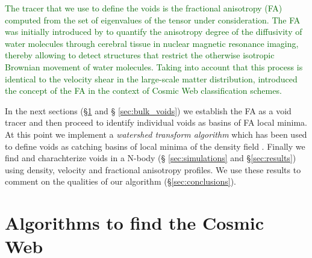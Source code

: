 \documentclass[a4,useAMS,usenatbib,usegraphicx]{mn2e}
\newcommand{\after}[1]{\textcolor{darkgreen}{ #1}}
\begin{document}
\after{The tracer that we use to define the voids is the fractional
anisotropy (FA) computed from the set of eigenvalues of the tensor
under consideration. 
The FA was initially introduced by \citet{Basser95} to quantify the
anisotropy degree of the diffusivity of water molecules through
cerebral tissue in nuclear magnetic resonance imaging, thereby allowing to 
detect structures that restrict the otherwise isotropic Brownian movement 
of water molecules. Taking into account that this process is identical to 
the velocity shear in the large-scale matter distribution, 
\citet{Libeskind13} introduced the concept of the FA in the context of 
Cosmic Web classification schemes.}


In the next sections (\S \ref{sec:algorithms_cosmic_web} and \S
\ref{sec:bulk_voids}) we establish the FA as a void tracer and then
proceed to identify individual voids as basins of FA local minima.  At
this point we implement a \textit{watershed transform algorithm}
\citep{Beucher79,Beucher93} which has been used to define voids as
catching basins of local minima of the density field \citep{Platen07,Neyrinck08}.
Finally we find and charachterize voids in a N-body (\S
\ref{sec:simulations} and \S \ref{sec:results}) using density, velocity and
fractional anisotropy profiles.  We use these results to comment on
the qualities of our algorithm (\S \ref{sec:conclusions}).  



\section{Algorithms to find the Cosmic Web}
\label{sec:algorithms_cosmic_web}
\end{document}
